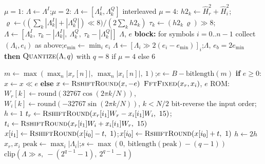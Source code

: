 \begin{algorithm}[H]
\begin{algorithmic}[1]
\State $\mu = 1$: $\Lambda \gets \Lambda^I$;\quad $\mu = 2$: $\Lambda \gets [\Lambda^I_k, \Lambda^Q_k]$ interleaved
\State $\mu = 4$: $h2_k \gets \hat H_r^2 + \hat H_i^2$;\quad $\varrho \gets \big((\sum_k |\Lambda^I_k| + |\Lambda^Q_k|) \ll 8\big) \big/ (2 \sum_k h2_k)$
\Statex \hspace{\algorithmicindent} $\tau_k \gets (h2_k\, \varrho) \gg 8$;\quad $\Lambda \gets [\Lambda^I_k,\ \tau_k - |\Lambda^I_k|,\ \Lambda^Q_k,\ \tau_k - |\Lambda^Q_k|]$ 
\State \Return $\Lambda$, $e$
\Statex
\State \textbf{block:} for symbols $i = 0..n{-}1$ collect $(\Lambda_i, e_i)$ as above;\quad $e_{\min} \gets \min_i e_i$
\State $\Lambda \gets [\Lambda_i \gg 2(e_i - e_{\min})]_i$;\quad \Return $\Lambda$, $e_b = 2 e_{\min}$ 
\State \textbf{then} $\textsc{Quantize}(\Lambda, q)$ with $q = 8$ if $\mu = 4$ else $6$ 
\end{algorithmic}
\end{algorithm}

\begin{algorithm}[H]
\caption{Integer primitives of Algorithm~\ref{alg:demod_int} (\texttt{fixed/fft.py}, \texttt{fixed/fxp.py}; bit-identical in \texttt{cport/src/fft.c}).}
\label{alg:demod_prims}
\begin{algorithmic}[1]
\Function{FftBfp}{$x_r[0..N)$, $x_i[0..N)$, $B$} 
    \State $m \gets \max(\max_n |x_r[n]|,\ \max_n |x_i[n]|,\ 1)$;\quad $e \gets B - \mathrm{bitlength}(m)$ 
    \State \textbf{if} $e \ge 0$: $x \gets x \ll e$ \textbf{else} $x \gets \textsc{RshiftRound}(x, -e)$ 
    \State \Return $\textsc{FftFixed}(x_r, x_i)$, $e$ 
\EndFunction
\Statex
{} 
    \State ROM: $W_r[k] \gets \mathrm{round}(32767 \cos(2\pi k/N))$,\ $W_i[k] \gets \mathrm{round}(-32767 \sin(2\pi k/N))$, $k < N/2$
    \State bit-reverse the input order;\quad $h \gets 1$
            \State $t_r \gets \textsc{RshiftRound}(x_r[i_1] W_r - x_i[i_1] W_i,\ 15)$;\quad $t_i \gets \textsc{RshiftRound}(x_r[i_1] W_i + x_i[i_1] W_r,\ 15)$
            \State $x[i_1] \gets \textsc{RshiftRound}(x[i_0] - t,\ 1)$;\quad $x[i_0] \gets \textsc{RshiftRound}(x[i_0] + t,\ 1)$ 
        \EndFor
        \State $h \gets 2h$
    \EndWhile
    \State \Return $x_r, x_i$
\EndFunction
\Statex
{} 
    \State $\mathrm{peak} \gets \max_i |\Lambda_i|$;\quad $s \gets \max(0,\ \mathrm{bitlength}(\mathrm{peak}) - (q - 1))$
    \State \Return $\mathrm{clip}(\Lambda \gg s,\ -(2^{q-1} - 1),\ 2^{q-1} - 1)$ 
\EndFunction
\end{algorithmic}
\end{algorithm}

